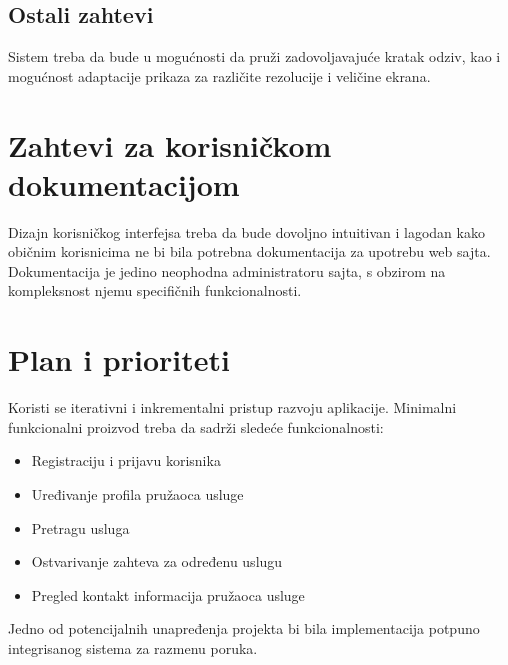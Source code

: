 \documentclass[a4paper,12pt]{report}
\begin{document}
\subsection{Ostali zahtevi}
Sistem treba da bude u mogućnosti da pruži zadovoljavajuće kratak odziv, kao i mogućnost adaptacije prikaza za različite rezolucije i veličine ekrana.
\section{Zahtevi za korisničkom dokumentacijom}
Dizajn korisničkog interfejsa treba da bude dovoljno intuitivan i lagodan kako običnim korisnicima ne bi bila potrebna dokumentacija za upotrebu web sajta.
Dokumentacija je jedino neophodna administratoru sajta, s obzirom na kompleksnost njemu specifičnih funkcionalnosti.
\newpage
\section{Plan i prioriteti}
Koristi se iterativni i inkrementalni pristup razvoju aplikacije. Minimalni funkcionalni proizvod treba da sadrži sledeće funkcionalnosti:
\begin{itemize}
        \item Registraciju i prijavu korisnika
        \item Uređivanje profila pružaoca usluge
        \item Pretragu usluga
        \item Ostvarivanje zahteva za određenu uslugu
        \item Pregled kontakt informacija pružaoca usluge
    \end{itemize}
    Jedno od potencijalnih unapređenja projekta bi bila implementacija potpuno integrisanog sistema za razmenu poruka.
\end{document}
